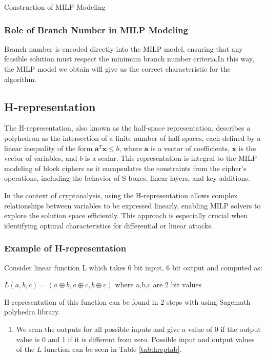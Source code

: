 \begin{section}{Construction of MILP Modeling}
\subsubsection{Role of Branch Number in MILP Modeling}
Branch number is encoded directly into the MILP model, ensuring that any feasible solution must respect the minimum branch number criteria.In this way, the MILP model we obtain will give us the correct characteristic for the algorithm.

\subsection{H-representation}

The H-representation, also known as the half-space representation, describes a polyhedron as the intersection of a finite number of half-spaces, each defined by a linear inequality of the form $ \mathbf{a}^T \mathbf{x} \leq b $, where $\mathbf{a} $ is a vector of coefficients, $ \mathbf{x} $ is the vector of variables, and $ b $ is a scalar. This representation is integral to the MILP modeling of block ciphers as it encapsulates the constraints from the cipher's operations, including the behavior of S-boxes, linear layers, and key additions.

In the context of cryptanalysis, using the H-representation allows complex relationships between variables to be expressed linearly, enabling MILP solvers to explore the solution space efficiently. This approach is especially crucial when identifying optimal characteristics for differential or linear attacks.

\subsubsection{Example of H-representation}

Consider linear function L which takes 6 bit input, 6 bit output and computed as:
\begin{center}
    $L(a,b,c)=(a \oplus b , a \oplus c , b \oplus c ) \text{ where a,b,c are 2 bit values}  $
\end{center}


H-representation of this function can be found in 2 steps with using  Sagemath polyhedra library. \cite{sage}

\begin{enumerate}
    \item We scan the outputs for all possible inputs and give a value of 0 if the output value is 0 and 1 if it is different from zero. Possible input and output values of the $L$ function can be seen in Table \ref{tab:hreptab}.


\end{enumerate}
\end{section}
